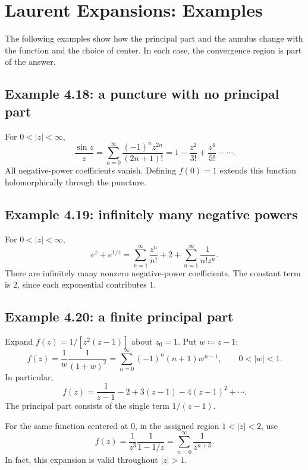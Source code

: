 \documentclass[11pt,a4paper]{article}
\theoremstyle{definition}
\theoremstyle{plain}
\begin{document}
\section{Laurent Expansions: Examples}
The following examples show how the principal part and the annulus
change with the function and the choice of center. In each case,
the convergence region is part of the answer.

\subsection{Example 4.18: a puncture with no principal part}
For $0<|z|<\infty$,
\begin{equation}\label{eq:12}
\frac{\sin z}{z}
 =\sum_{n=0}^{\infty}\frac{(-1)^nz^{2n}}{(2n+1)!}
 =1-\frac{z^2}{3!}+\frac{z^4}{5!}-\cdots .
\end{equation}
All negative-power coefficients vanish. Defining $f(0)=1$ extends this
function holomorphically through the puncture.

\subsection{Example 4.19: infinitely many negative powers}
For $0<|z|<\infty$,
\begin{equation}\label{eq:13}
e^z+e^{1/z}
 =\sum_{n=1}^{\infty}\frac{z^n}{n!}
      +2+\sum_{n=1}^{\infty}\frac1{n!z^n}.
\end{equation}
There are infinitely many nonzero negative-power coefficients. The
constant term is $2$, since each exponential contributes $1$.

\subsection{Example 4.20: a finite principal part}
Expand $f(z)=1/[z^2(z-1)]$ about $z_0=1$. Put $w\coloneqq z-1$:
\begin{equation}\label{eq:14}
f(z)=\frac1w\frac1{(1+w)^2}
 =\boxed{\sum_{n=0}^{\infty}(-1)^n(n+1)w^{n-1}},
 \qquad 0<|w|<1.
\end{equation}
In particular,
\begin{equation}\label{eq:15}
f(z)=\frac1{z-1}-2+3(z-1)-4(z-1)^2+\cdots .
\end{equation}
The principal part consists of the single term $1/(z-1)$.

For the same function centered at $0$, in the assigned region
$1<|z|<2$, use
\begin{equation}\label{eq:16}
f(z)=\frac1{z^3}\frac1{1-1/z}
     =\sum_{n=0}^{\infty}\frac1{z^{n+3}}.
\end{equation}
In fact, this expansion is valid throughout $|z|>1$.
\end{document}
